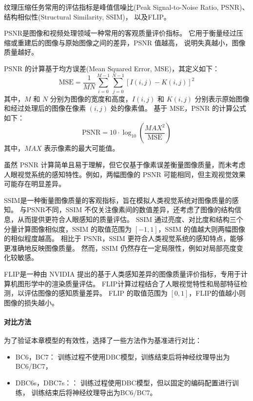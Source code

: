 纹理压缩任务常用的评估指标是峰值信噪比(Peak Signal-to-Noise Ratio, PSNR)、
结构相似性\cite{wang2004image}(Structural Similarity, SSIM)，
以及FLIP\cite{andersson2020flip}。

PSNR是图像和视频处理领域一种常用的客观质量评价指标。
它用于衡量经过压缩或重建后的图像与原始图像之间的差异，PSNR 值越高，
说明失真越小，图像质量越好。

PSNR 的计算基于均方误差(Mean Squared Error, MSE)，其定义如下：
\begin{equation}
\text{MSE} = \frac{1}{MN} \sum_{i=0}^{M-1} \sum_{j=0}^{N-1} \left[ I(i,j) - K(i,j) \right]^2
\end{equation}
其中，$M$ 和 $N$ 分别为图像的宽度和高度，$I(i,j)$ 和 $K(i,j)$ 分别表示原始图像和经过处理后的图像在像素 $(i,j)$ 处的像素值。
基于 MSE，PSNR 的计算公式如下：
\begin{equation}
    \text{PSNR} = 10 \cdot \log_{10} \left( \frac{MAX^2}{\text{MSE}} \right)
\end{equation}
其中，$MAX$ 表示像素的最大可能值。

虽然 PSNR 计算简单且易于理解，但它仅基于像素误差衡量图像质量，而未考虑人眼视觉系统的感知特性。例如，两幅图像的 PSNR 可能相同，但主观视觉效果可能存在明显差异。

SSIM\cite{wang2004image}是一种衡量图像质量的客观指标，旨在模拟人类视觉系统对图像质量的感知。
与PSNR不同，SSIM 不仅关注像素间的数值差异，还考虑了图像的结构信息，从而提供更符合人眼感知的质量评估。
SSIM 通过亮度、对比度和结构三个分量计算图像相似度，SSIM 的取值范围为 $[-1,1]$，SSIM
的值越大则两幅图像的相似程度越高。
相比于 PSNR，SSIM 更符合人类视觉系统的感知特点，能够更准确地反映图像质量。
然而，SSIM 仍然存在一定局限性，例如对局部亮度变化较敏感。

FLIP\cite{andersson2020flip}是一种由 NVIDIA 提出的基于人类感知差异的图像质量评价指标，专用于计算机图形学中的渲染质量评估。
FLIP计算过程结合了人眼视觉特性和局部特征检测，以评估图像的感知质量差异。
FLIP 的取值范围为 $[0,1]$，FLIP的值越小则图像的损失越小。


\paragraph{对比方法}

为了验证本章模型的有效性，选择了一些方法作为基准进行对比：

\begin{itemize}
\item BC6，BC7： 训练过程不使用DBC模型，训练结束后将神经纹理导出为BC6/BC7，
\item DBC6s，DBC7s：： 训练过程使用DBC模型，但以固定的编码配置进行训练，
训练结束后将神经纹理导出为BC6/BC7。
\end{itemize}

